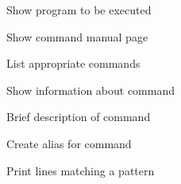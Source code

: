\documentclass[12pt, a4paper]
{article}
\begin{document}
\begin{multicols}{3}

\begin{description}[nolistsep]
	\item[which] Show program to be executed
	\item[man] Show command manual page
	\item[apropos] List appropriate commands
	\item[info] Show information about command
	\item[whatis] Brief description of command
	\item[alias] Create alias for command
\end{description}


\begin{description}[nolistsep]
	\item[grep] Print lines matching a pattern
\end{description}

\end{multicols}
\end{document}
